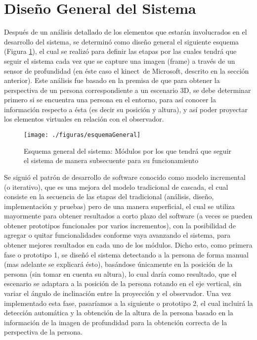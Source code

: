 \documentclass[a4paper,openright,12pt]{report}
\begin{document}
\section{Diseño General del Sistema}
Después de un análisis detallado de los elementos que estarán involucrados en el desarrollo del sistema, se determinó como diseño general el siguiente esquema (Figura \ref{fig:esquemaGeneral}), el cual se realizó para definir las etapas por las cuales tendrá que seguir el sistema cada vez que se capture una imagen (frame) a través de un sensor de profundidad (en éste caso el kinect\textcopyright\ de Microsoft\textcopyright, descrito en la sección anterior). Este análisis fue basado en la premisa de que para obtener la perspectiva de un persona correspondiente a un escenario 3D, se debe determinar primero si se encuentra una persona en el entorno, para así conocer la información respecto a ésta (es decir su posición y altura), y así poder proyectar los elementos virtuales en relación con el observador.\\
\begin{figure}[tbh]
	\centering
	\texttt{[image: ./figuras/esquemaGeneral]}
	\caption[Esquema general del sistema]{Esquema general del sistema: Módulos por los que tendrá que seguir el sistema de manera subsecuente  para su funcionamiento} \label{fig:esquemaGeneral}
\end{figure}
Se siguió el patrón de desarrollo de software conocido como modelo incremental (o iterativo), que es una mejora del modelo tradicional de cascada, el cual consiste en la secuencia de las etapas del tradicional (análisis, diseño,  implementación y pruebas) pero de una manera superficial, el cual se utiliza mayormente para obtener resultados a corto plazo del software (a veces se pueden obtener prototipos funcionales por varios incrementos), con la posibilidad de agregar o quitar funcionalidades conforme vaya avanzando el sistema, para obtener mejores resultados en cada uno de los módulos. Dicho esto, como primera fase o prototipo 1, se diseñó el sistema detectando a la persona de forma manual (mas adelante se explicará ésto), basándose únicamente en la posición de la persona (sin tomar en cuenta su altura), lo cual daría como resultado, que el escenario se adaptara a la posición de la persona rotando en el eje vertical, sin variar el ángulo de inclinación entre la proyección y el observador. Una vez implementado esta fase, pasaríamos a la siguiente o prototipo 2, el cual incluirá la detección automática y la obtención de la altura de la persona basado en la información de la imagen de profundidad para la obtención correcta de la perspectiva de la persona.
\end{document}
